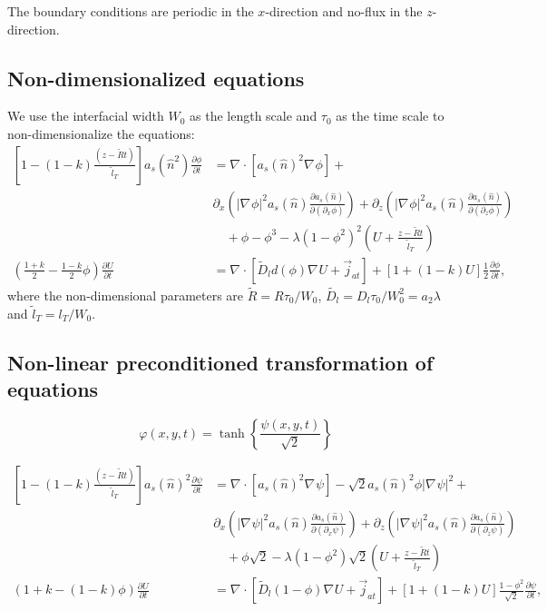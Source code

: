 \documentclass[a4paper,12pt]{article}
\renewcommand{\div}[1]{\nabla_{#1} \cdot}
\newcommand{\grad}[1]{\nabla_{#1}}
\begin{document}
The boundary conditions are periodic in the $x$-direction and no-flux in the $z$-direction.

\subsection{Non-dimensionalized equations}
We use  the interfacial width $W_0$ as the length scale and $\tau_0$ as the time scale to non-dimensionalize the equations:
\begin{align}
 \left[1-(1-k) \frac{(z- \tilde{R} t)}{ \tilde{l}_T} \right] a_s(\hat{n}^2) \frac{\partial \phi}{\partial t} &= 
  \div{} [a_s(\hat{n})^2 \grad{} \phi] + \nonumber  \\  
 & \partial_x \left( |\grad{} \phi|^2 a_s(\hat{n}) \frac{\partial a_s(\hat{n})}{\partial (\partial_x \phi)}  \right)  + 
\partial_z \left( |\grad{} \phi|^2 a_s(\hat{n}) \frac{\partial a_s(\hat{n})}{\partial (\partial_z \phi)}  \right)   \nonumber \\
& \quad + \phi - \phi^3 - \lambda (1-\phi^2)^2 \left(U + \frac{z-\tilde{R} t}{ \tilde{l}_T} \right) \\
\left(\frac{1+k}{2}-\frac{1-k}{2}\phi \right) \frac{\partial U}{\partial t} &= \div{} [\tilde{D}_l d(\phi) \grad{} U + \vec{j}_{at}] + [1+(1-k)U]\frac{1}{2}  \frac{\partial \phi}{\partial t},
\end{align}
where the non-dimensional parameters are  $\tilde{R} = R\tau_0 / W_0$, $\tilde{D_l} = D_l \tau_0 / W_0^2 = a_{2}\lambda$ and $\tilde{l}_T = l_T / W_0$.

\subsection{Non-linear preconditioned transformation of equations}

\begin{equation}
\varphi(x, y, t)=\tanh \left\{\frac{\psi(x, y, t)}{\sqrt{2}}\right\}
\end{equation}

\begin{align}
 \left[1-(1-k) \frac{(z- \tilde{R} t)}{ \tilde{l}_T} \right] a_s(\hat{n})^2 \frac{\partial \psi}{\partial t} &= 
  \div{} [a_s(\hat{n})^2 \grad{} \psi] - \sqrt{2}a_s(\hat{n})^2\phi|\grad{} \psi|^2 + \nonumber  \\  
 & \partial_x \left( |\grad{} \psi|^2 a_s(\hat{n}) \frac{\partial a_s(\hat{n})}{\partial (\partial_x \psi)}  \right)  + 
\partial_z \left( |\grad{} \psi|^2 a_s(\hat{n}) \frac{\partial a_s(\hat{n})}{\partial (\partial_z \psi)}  \right)   \nonumber \\
& \quad + \phi \sqrt{2} - \lambda (1-\phi^2)\sqrt{2} \left(U + \frac{z-\tilde{R} t}{ \tilde{l}_T} \right) \\
\left(1+k-(1-k)\phi \right) \frac{\partial U}{\partial t} &= \div{} [\tilde{D}_l (1-\phi) \grad{} U + \vec{j}_{at}] + [1+(1-k)U]\frac{1-\phi^{2}}{\sqrt{2}}  \frac{\partial \psi}{\partial t},
\end{align}
\end{document}
